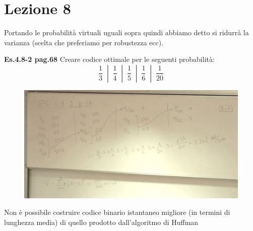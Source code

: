 \section*{Lezione 8}

Portando le probabilità virtuali uguali sopra quindi abbiamo detto si ridurrà la varianza (scelta che preferiamo per robustezza ecc).
\medskip

\textbf{Es.4.8-2 pag.68}
Creare codice ottimale per le seguenti probabilità:\\
\begin{equation*}
\frac{1}{3} \; \; | \; \;
\frac{1}{4} \; \; | \; \;
\frac{1}{5} \; \; | \; \;
\frac{1}{6} \; \; | \; \;
\frac{1}{20}
\end{equation*}


\begin{figure}[h]
	\centering
	\includegraphics[width=\linewidth]{immagini/img18}
\end{figure}

Non è possibile costruire codice binario istantaneo migliore (in termini di lunghezza media) di quello prodotto dall'algoritmo di Huffman

